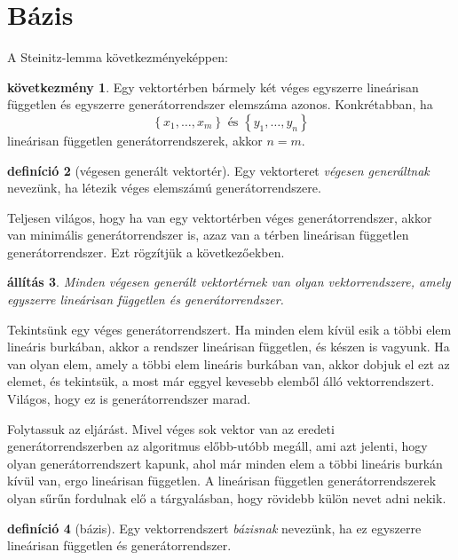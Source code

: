 \documentclass[9pt, showtrims]{memoir}
\makeatletter
\renewenvironment{proof}[1][\proofname]
    {\par\pushQED{\qed}%
    \normalfont \topsep6\p@\@plus6\p@\relax
    \trivlist
    \item[\hskip\labelsep
        \itshape
    #1\@addpunct{:}]\ignorespaces}
    {\popQED\endtrivlist\@endpefalse}
\theoremstyle{plain}
\newtheorem{proposition}{állítás}[section]
\theoremstyle{remark}
\theoremstyle{definition}
\newtheorem{definition}[proposition]{definíció}
\newtheorem{corollary}[proposition]{következmény}
\makeatother
\begin{document}
\section{Bázis}
A Steinitz-lemma következményeképpen:
\begin{corollary}
    Egy vektortérben bármely két véges egyszerre lineárisan független és egyszerre generátorrendszer elemszáma azonos.
    Konkrétabban, ha
    \[
        \left\{ x_1,\dots,x_m \right\} \text{ és } \left\{ y_1,\dots,y_n \right\}
    \]
    lineárisan független generátorrendszerek, akkor $n=m$.
    \label{co:baziselemszam}
\end{corollary}
\begin{definition}[végesen generált vektortér]
    Egy vektorteret \emph{végesen generáltnak} nevezünk,
    ha létezik véges elemszámú generátorrendszere.
\end{definition}
Teljesen világos, hogy ha van egy vektortérben véges generátorrendszer,
akkor van minimális generátorrendszer is, azaz van a térben lineárisan független generátorrendszer.
Ezt rögzítjük a következőekben.
\begin{proposition}
    Minden végesen generált vektortérnek van olyan vektorrendszere, 
    amely egyszerre lineárisan független és generátorrendszer.
    \label{pr:bazisletezik}
\end{proposition}
\begin{proof}
    Tekintsünk egy véges generátorrendszert.
    Ha minden elem kívül esik a többi elem lineáris burkában, akkor a rendszer lineárisan független, és készen is vagyunk.
    Ha van olyan elem, amely a többi elem lineáris burkában van, akkor dobjuk el ezt az elemet, és tekintsük, a most már
    eggyel kevesebb elemből álló vektorrendszert. 
    Világos, hogy ez is generátorrendszer marad.

    Folytassuk az eljárást.
    Mivel véges sok vektor van az eredeti generátorrendszerben az algoritmus előbb-utóbb megáll,
    ami azt jelenti, hogy olyan generátorrendszert kapunk, 
    ahol már minden elem a többi lineáris burkán kívül van,
    ergo lineárisan független.
\end{proof}
A lineárisan független generátorrendszerek olyan sűrűn fordulnak elő a tárgyalásban,
hogy rövidebb külön nevet adni nekik.
\begin{definition}[bázis]
    Egy vektorrendszert \emph{bázisnak} nevezünk, ha ez egyszerre lineárisan független és generátorrendszer.
\end{definition}
\end{document}

